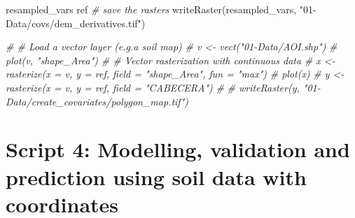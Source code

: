 \documentclass[
  10pt,
  b5paper,
  oneside]{book}
\newenvironment{Shaded}{\begin{snugshade}}{\end{snugshade}}
\newcommand{\CommentTok}[1]{\textcolor[rgb]{0.56,0.35,0.01}{\textit{#1}}}
\newcommand{\FunctionTok}[1]{\textcolor[rgb]{0.00,0.00,0.00}{#1}}
\newcommand{\NormalTok}[1]{#1}
\newcommand{\StringTok}[1]{\textcolor[rgb]{0.31,0.60,0.02}{#1}}
\begin{document}
\begin{Shaded}
\begin{Highlighting}[]
\NormalTok{resampled\_vars}
\NormalTok{ref}
\CommentTok{\# save the rasters}
\FunctionTok{writeRaster}\NormalTok{(resampled\_vars, }\StringTok{"01{-}Data/covs/dem\_derivatives.tif"}\NormalTok{)}

\CommentTok{\# \# Load a vector layer (e.g.a soil map) }
\CommentTok{\# v \textless{}{-} vect("01{-}Data/AOI.shp")}
\CommentTok{\# plot(v, "shape\_Area")}
\CommentTok{\# \# Vector rasterization with continuous data}
\CommentTok{\# x \textless{}{-} rasterize(x = v, y = ref, field = "shape\_Area", fun = "max")}
\CommentTok{\# plot(x)}
\CommentTok{\# y \textless{}{-} rasterize(x = v, y = ref, field = "CABECERA")}
\CommentTok{\# }
\CommentTok{\# writeRaster(y, "01{-}Data/create\_covariates/polygon\_map.tif")}
\end{Highlighting}
\end{Shaded}

\hypertarget{script-4-modelling-validation-and-prediction-using-soil-data-with-coordinates}{%
\section*{Script 4: Modelling, validation and prediction using soil data with coordinates}\label{script-4-modelling-validation-and-prediction-using-soil-data-with-coordinates}}
\end{document}
